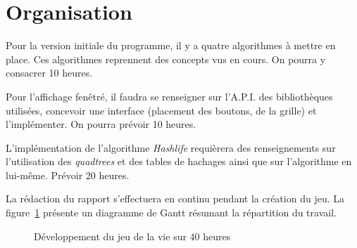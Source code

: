 \section{Organisation}

Pour la version initiale du programme, il y a quatre algorithmes à
mettre en place. Ces algorithmes reprennent des concepts
vus en cours. On pourra y consacrer 10 heures.

Pour l'affichage fenêtré, il faudra se renseigner sur l'A.P.I. des
bibliothèques utilisées, concevoir une interface (placement des boutons,
de la grille) et l'implémenter. On pourra prévoir 10 heures.

L'implémentation de l'algorithme \emph{Hashlife} requièrera des renseignements
sur l'utilisation des \emph{quadtrees} et des tables de hachages ainsi
que sur l'algorithme en lui-même. Prévoir 20 heures.

La rédaction du rapport s'effectuera en continu pendant la création du jeu.
La figure~\ref{fig:life-gantt} présente un diagramme de Gantt résumant
la répartition du travail.

\begin{figure}[h!]
    \centering
    
    \caption{Développement du jeu de la vie sur 40 heures}
    \label{fig:life-gantt}
\end{figure}

